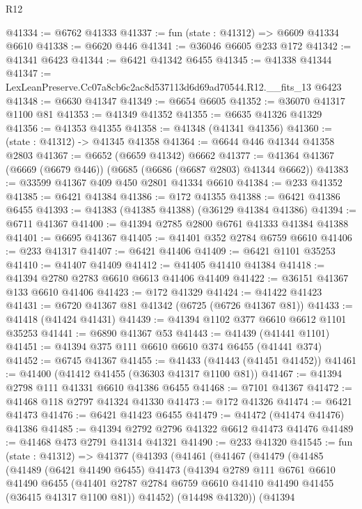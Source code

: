 \begin{lexlean}{R12}
\begin{coremodule}
@41334 := @6762 @41333
@41337 := fun (state : @41312) => @6609 @41334 @6610
@41338 := @6620 @446
@41341 := @36046 @6605 @233 @172
@41342 := @41341 @6423
@41344 := @6421 @41342 @6455
@41345 := @41338 @41344
@41347 := LexLeanPreserve.Cc07a8cb6c2ac8d537113d6d69ad70544.R12.__fits_13 @6423
@41348 := @6630 @41347
@41349 := @6654 @6605
@41352 := @36070 @41317 @1100 @81
@41353 := @41349 @41352
@41355 := @6635 @41326 @41329
@41356 := @41353 @41355
@41358 := @41348 (@41341 @41356)
@41360 := (state : @41312) -> @41345 @41358
@41364 := @6644 @446 @41344 @41358 @2803
@41367 := @6652 (@6659 @41342) @6662
@41377 := @41364 @41367 (@6669 (@6679 @446)) (@6685 (@6686 (@6687 @2803) @41344 @6662))
@41383 := @33599 @41367 @409 @450 @2801 @41334 @6610
@41384 := @233 @41352
@41385 := @6421 @41384
@41386 := @172 @41355
@41388 := @6421 @41386 @6455
@41393 := @41383 (@41385 @41388) (@36129 @41384 @41386)
@41394 := @6711 @41367
@41400 := @41394 @2785 @2800 @6761 @41333 @41384 @41388
@41401 := @6695 @41367
@41405 := @41401 @352 @2784 @6759 @6610
@41406 := @233 @41317
@41407 := @6421 @41406
@41409 := @6421 @1101 @35253
@41410 := @41407 @41409
@41412 := @41405 @41410 @41384
@41418 := @41394 @2780 @2783 @6610 @6613 @41406 @41409
@41422 := @36151 @41367 @133 @6610 @41406
@41423 := @172 @41329
@41424 := @41422 @41423
@41431 := @6720 @41367 @81 @41342 (@6725 (@6726 @41367 @81))
@41433 := @41418 (@41424 @41431)
@41439 := @41394 @1102 @377 @6610 @6612 @1101 @35253
@41441 := @6890 @41367 @53
@41443 := @41439 (@41441 @1101)
@41451 := @41394 @375 @111 @6610 @6610 @374 @6455 (@41441 @374)
@41452 := @6745 @41367
@41455 := @41433 (@41443 (@41451 @41452))
@41461 := @41400 (@41412 @41455 (@36303 @41317 @1100 @81))
@41467 := @41394 @2798 @111 @41331 @6610 @41386 @6455
@41468 := @7101 @41367
@41472 := @41468 @118 @2797 @41324 @41330
@41473 := @172 @41326
@41474 := @6421 @41473
@41476 := @6421 @41423 @6455
@41479 := @41472 (@41474 @41476) @41386
@41485 := @41394 @2792 @2796 @41322 @6612 @41473 @41476
@41489 := @41468 @473 @2791 @41314 @41321
@41490 := @233 @41320
@41545 := fun (state : @41312) =>
  @41377
    (@41393
      (@41461
        (@41467
          (@41479
            (@41485
              (@41489
                (@6421 @41490 @6455)
                @41473
                (@41394
                  @2789
                  @111
                  @6761
                  @6610
                  @41490
                  @6455
                  (@41401 @2787 @2784 @6759 @6610 @41410 @41490 @41455 (@36415 @41317 @1100 @81))
                  @41452)
                (@14498 @41320))
              (@41394

\end{coremodule}
\end{lexlean}
